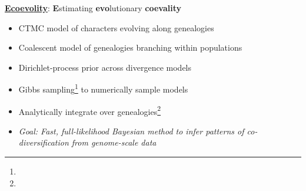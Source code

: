 














% 

% 




    





\begin{frame}
    \begin{center}
        \LARGE
        \href{https://github.com/phyletica/ecoevolity}{
            \textbf{\textcolor{pgreen}{E}\textcolor{pteal}{co\textcolor{pauburn}{evo}lity}}}:
        \textcolor{pgreen}{\bf E}stimating \textcolor{pauburn}{\bf evo}lutionary \textcolor{pteal}{\bf coevality}
    \end{center}

    \begin{itemize}
        \item<2-> CTMC model of characters evolving along genealogies
        \item<2-> Coalescent model of genealogies branching within populations
        \item<2-> Dirichlet-process prior across divergence models
        \item<2-> Gibbs sampling\footnote{\tiny{}}
                  to numerically sample models
        \item<2-> Analytically integrate over genealogies\footnote{\tiny{}}

        \bigskip
        \item<3-> \textsl{Goal: Fast, full-likelihood Bayesian method to infer
                patterns of co-diversification from genome-scale data}
    \end{itemize}
\end{frame}


